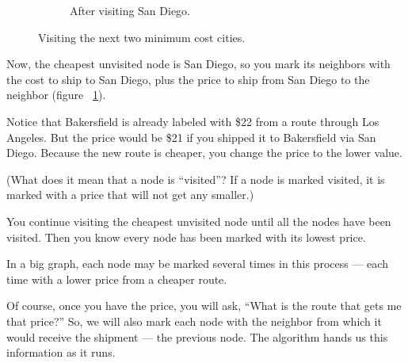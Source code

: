 \begin{figure}[H]
\begin{subfigure}{0.4\textwidth}
        \caption{After visiting San Diego.}
        \label{fig:step2b}
    \end{subfigure}

    \caption{Visiting the next two minimum cost cities.}
    \label{fig:step2}
\end{figure}

Now, the cheapest unvisited node is San Diego, so you mark its
neighbors with the cost to ship to San Diego, plus the price to ship
from San Diego to the neighbor (figure ~\ref{fig:step2b}).

Notice that Bakersfield is already labeled with \$22 from a route
through Los Angeles.  But the price would be \$21 if you shipped it to
Bakersfield via San Diego.  Because the new route is cheaper, you
change the price to the lower value.

(What does it mean that a node is ``visited''?  If a node is marked
visited, it is marked with a price that will not get any smaller.)

You continue visiting the cheapest unvisited node until all the
nodes have been visited.  Then you know every node has been marked
with its lowest price.

In a big graph, each node may be marked several times in this process
--- each time with a lower price from a cheaper route.

Of course, once you have the price, you will ask, ``What is the route
that gets me that price?''  So, we will also mark each node with the
neighbor from which it would receive the shipment --- the previous
node.  The algorithm hands us this information as it runs.

